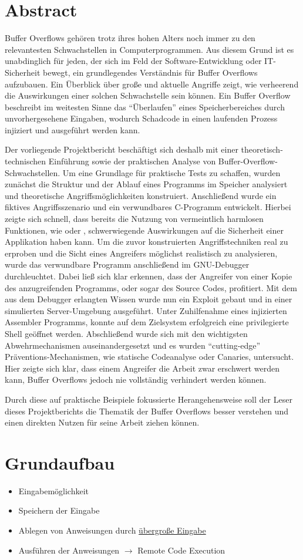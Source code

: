 \section{Abstract}
Buffer Overflows gehören trotz ihres hohen Alters noch immer zu den relevantesten Schwachstellen in Computerprogrammen.
Aus diesem Grund ist es unabdinglich für jeden, der sich im Feld der Software-Entwicklung oder IT-Sicherheit bewegt, 
ein grundlegendes Verständnis für Buffer Overflows aufzubauen. Ein Überblick über große und aktuelle Angriffe zeigt, 
wie verheerend die Auswirkungen einer solchen Schwachstelle sein können. Ein Buffer Overflow beschreibt im weitesten 
Sinne das “Überlaufen” eines Speicherbereiches durch unvorhergesehene Eingaben, wodurch Schadcode in einen laufenden 
Prozess injiziert und ausgeführt werden kann.

Der vorliegende Projektbericht beschäftigt sich deshalb mit einer theoretisch-technischen Einführung sowie der praktischen 
Analyse von Buffer-Overflow-Schwachstellen. Um eine Grundlage für praktische Tests zu schaffen, wurden zunächst  
die Struktur und der Ablauf eines Programms im Speicher analysiert und theoretische Angriffsmöglichkeiten konstruiert.
Anschließend wurde ein fiktives Angriffsszenario und ein verwundbares C-Programm entwickelt. Hierbei zeigte sich schnell,
dass bereits die Nutzung von vermeintlich harmlosen Funktionen, wie  oder , schwerwiegende Auswirkungen
auf die Sicherheit einer Applikation haben kann. Um die zuvor konstruierten Angriffstechniken real zu erproben und die
Sicht eines Angreifers möglichst realistisch zu analysieren, wurde das verwundbare Programm anschließend im GNU-Debugger
durchleuchtet. Dabei ließ sich klar erkennen, dass der Angreifer von einer Kopie des anzugreifenden Programms, oder sogar
des Source Codes, profitiert. Mit dem aus dem Debugger erlangten Wissen wurde nun ein Exploit gebaut und in einer
simulierten Server-Umgebung ausgeführt. Unter Zuhilfenahme eines injizierten Assembler Programms, konnte auf dem
Zielsystem erfolgreich eine privilegierte Shell geöffnet werden.
Abschließend wurde sich mit den wichtigsten
Abwehrmechanismen auseinandergesetzt und es wurden “cutting-edge” Präventions-Mechanismen,
wie statische Codeanalyse oder Canaries, untersucht. Hier zeigte sich klar,
dass einem Angreifer die Arbeit zwar erschwert werden kann,
Buffer Overflows jedoch nie vollständig verhindert werden können.

Durch diese auf praktische Beispiele fokussierte Herangehensweise soll der Leser dieses Projektberichts die Thematik
der Buffer Overflows besser verstehen und einen direkten Nutzen für seine Arbeit ziehen können.
\pagebreak

\section{Grundaufbau}
    \begin{itemize}
        \item Eingabemöglichkeit
        \item Speichern der Eingabe
        \item Ablegen von Anweisungen durch \underline{übergroße Eingabe}  
        \item Ausführen der Anweisungen $\rightarrow$ Remote Code Execution
    \end{itemize}
